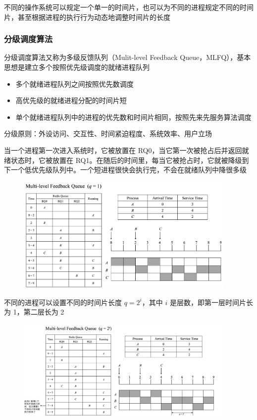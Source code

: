 \documentclass[cs4size,a4paper,10pt]{ctexart}
\begin{document}
	不同的操作系统可以规定一个单一的时间片，也可以为不同的进程规定不同的时间片，甚至根据进程的执行行为动态地调整时间片的长度


	\subsubsection{分级调度算法}
	分级调度算法又称为多级反馈队列（Mulit-level Feedback Queue，MLFQ），基本思想是建立多个按照优先级调度的就绪进程队列
	\begin{itemize}
		\item 多个就绪进程队列之间按照优先数调度
		\item 高优先级的就绪进程分配的时间片短
		\item 单个就绪进程队列中的进程的优先数和时间片相同，按照先来先服务算法调度
	\end{itemize}
	分级原则：外设访问、交互性、时间紧迫程度、系统效率、用户立场

	当一个进程第一次进入系统时，它被放置在 RQ0，当它第一次被抢占后并返回就绪状态时，它被放置在 RQ1。在随后的时间里，每当它被抢占时，它就被降级到下一个低优先级队列中。一个短进程很快会执行完，不会在就绪队列中降很多级

	\begin{figure}[H]
		\centering
		\includegraphics[width=0.95\textwidth]{img/Feedback(q=1)}
	\end{figure}

	不同的进程可以设置不同的时间片长度 $q = 2^i$，其中 $i$ 是层数，即第一层时间片长为 1，第二层长为 2

	\begin{figure}[H]
		\centering
		\includegraphics[width=0.95\textwidth]{img/Feedback(q=2^i)}
	\end{figure}
\end{document}
